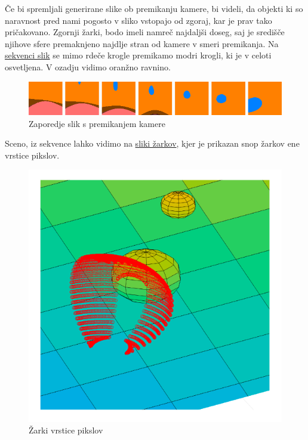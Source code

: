 \documentclass[titlepage]{article}
\begin{document}
\bigskip
\newline
Če bi spremljali generirane slike ob premikanju kamere, bi videli, da objekti ki so naravnost pred nami pogosto v sliko vstopajo od zgoraj, kar je prav tako pričakovano. Zgornji žarki, bodo imeli namreč najdaljši doseg, saj je središče njihove sfere premaknjeno najdlje stran od kamere v smeri premikanja. Na \hyperref[fig:sequence]{sekvenci slik} se mimo rdeče krogle premikamo modri krogli, ki je v celoti osvetljena. V ozadju vidimo oranžno ravnino.
\begin{figure}[H]
    \centering
    \includegraphics[width=1\linewidth]{Images/sequence.png}
    \caption{Zaporedje slik s premikanjem kamere}
    \label{fig:sequence}
\end{figure}
Sceno, iz sekvence lahko vidimo na \hyperref[fig:2sphRays2]{sliki žarkov}, kjer je prikazan snop žarkov ene vrstice pikslov.
\begin{figure}[H]
    \centering
    \includegraphics[width=0.5\linewidth]{Images/2sphere_rays2.png}
    \caption{Žarki vrstice pikslov}
    \label{fig:2sphRays2}
\end{figure}
\end{document}
